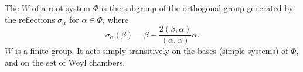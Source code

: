 The  $W$ of a root system $\Phi$ is the subgroup of the orthogonal group generated by the reflections $\sigma_\alpha$ for $\alpha \in \Phi$, where
$$\sigma_\alpha(\beta) = \beta - \frac{2(\beta, \alpha)}{(\alpha, \alpha)}\alpha.$$
$W$ is a finite group. It acts simply transitively on the bases (simple systems) of $\Phi$, and on the set of Weyl chambers.
